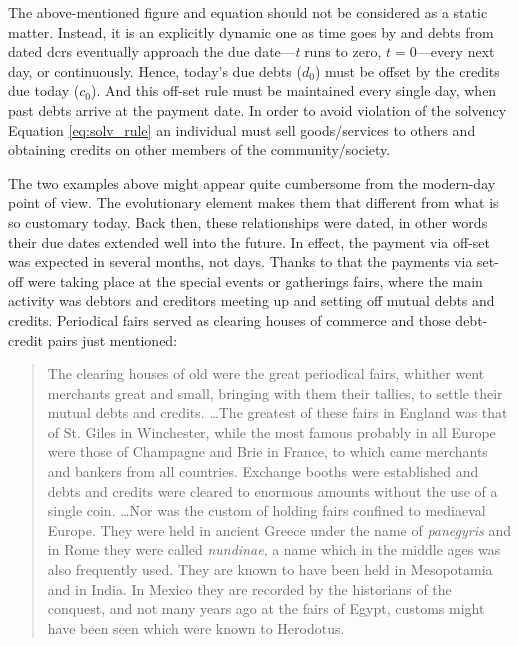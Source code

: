 The above-mentioned figure and equation should not be considered as a static matter. Instead, it is an explicitly dynamic one as time goes by and debts from dated \acfp{dcr} eventually approach the due date---\textit{t} runs to zero, \(t=0\)---every next day, or continuously. Hence, today's due debts (\(d_0\)) must be offset by the credits due today (\(c_0\)). And this off-set rule must be maintained every single day, when past debts arrive at the payment date. In order to avoid violation of the solvency Equation \ref{eq:solv_rule} an individual must sell goods/services to others and obtaining credits on other members of the community/society.

The two examples above might appear quite cumbersome from the modern-day point of view. The evolutionary element makes them that different from what is so customary today. Back then, these relationships were dated, in other words their due dates extended well into the future. In effect, the payment via off-set was expected in several months, not days. Thanks to that the payments via set-off were taking place at the special events or gatherings fairs, where the main activity was debtors and creditors meeting up and setting off mutual debts and credits. Periodical fairs served as clearing houses of commerce and those debt-credit pairs just mentioned:

\begin{quote}
The clearing houses of old were the great periodical fairs, whither went 
merchants great and small, bringing with them their tallies, to settle their
mutual debts and credits. \dots The greatest of these fairs
in England was that of St. Giles in Winchester, while the most famous
probably in all Europe were those of Champagne and Brie in France, to
which came merchants and bankers from all countries. Exchange booths
were established and debts and credits were cleared to enormous
amounts without the use of a single coin. \dots  Nor was the custom of holding fairs confined to mediaeval Europe. They were held in ancient Greece under the name of \textit{panegyris}
and in Rome they were called \textit{nundinae}, a name which in the middle ages
was also frequently used. They are known to have been held in
Mesopotamia and in India. In Mexico they are recorded by the historians
of the conquest, and not many years ago at the fairs of Egypt, customs
might have been seen which were known to Herodotus.~\citep[pp.~398-399, emphasis original]{innes1913}
\end{quote}

